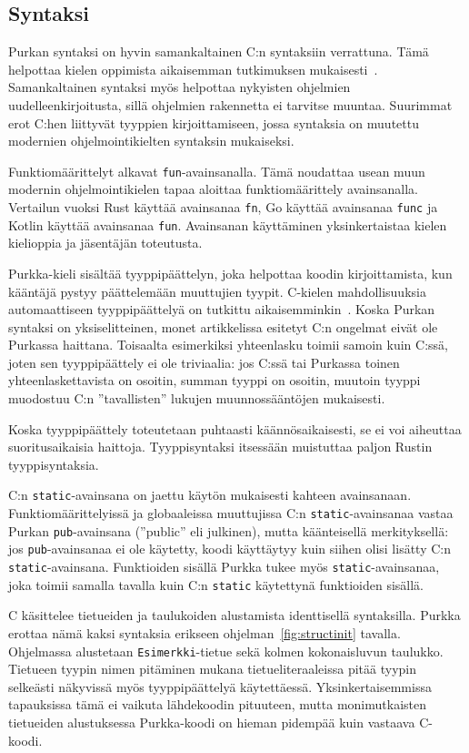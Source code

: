 \subsection{Syntaksi}

Purkan syntaksi on hyvin samankaltainen C:n syntaksiin verrattuna. Tämä
helpottaa kielen oppimista aikaisemman tutkimuksen
mukaisesti~\citep{languagelearning}. Samankaltainen syntaksi myös helpottaa
nykyisten ohjelmien uudelleenkirjoitusta, sillä ohjelmien rakennetta ei
tarvitse muuntaa. Suurimmat erot C:hen liittyvät tyyppien kirjoittamiseen,
jossa syntaksia on muutettu modernien ohjelmointikielten syntaksin mukaiseksi.

Funktiomäärittelyt alkavat \texttt{fun}-avainsanalla. Tämä noudattaa usean muun
modernin ohjelmointikielen tapaa aloittaa funktiomäärittely avainsanalla.
Vertailun vuoksi Rust käyttää avainsanaa \texttt{fn}, Go käyttää avainsanaa
\texttt{func} ja Kotlin käyttää avainsanaa \texttt{fun}. Avainsanan
käyttäminen yksinkertaistaa kielen kielioppia ja jäsentäjän toteutusta.

Purkka-kieli sisältää tyyppipäättelyn, joka helpottaa koodin kirjoittamista,
kun kääntäjä pystyy päättelemään muuttujien tyypit. C-kielen mahdollisuuksia
automaattiseen tyyppipäättelyä on tutkittu
aikaisemminkin~\citep[mm.][]{ctypeinference}. Koska Purkan syntaksi on
yksiselitteinen, monet artikkelissa esitetyt C:n ongelmat eivät ole Purkassa
haittana. Toisaalta esimerkiksi yhteenlasku toimii samoin kuin C:ssä, joten sen
tyyppipäättely ei ole triviaalia: jos C:ssä tai Purkassa toinen
yhteenlaskettavista on osoitin, summan tyyppi on osoitin, muutoin tyyppi
muodostuu C:n ''tavallisten'' lukujen muunnossääntöjen mukaisesti.

Koska tyyppipäättely toteutetaan puhtaasti käännösaikaisesti, se ei voi
aiheuttaa suoritusaikaisia haittoja. Tyyppisyntaksi itsessään muistuttaa paljon
Rustin tyyppisyntaksia.

C:n \texttt{static}-avainsana on jaettu käytön mukaisesti kahteen avainsanaan.
Funktiomäärittelyissä ja globaaleissa muuttujissa C:n
\texttt{static}-avainsanaa vastaa Purkan \texttt{pub}-avainsana (''public'' eli
julkinen), mutta käänteisellä merkityksellä: jos \texttt{pub}-avainsanaa ei ole
käytetty, koodi käyttäytyy kuin siihen olisi lisätty C:n
\texttt{static}-avainsana. Funktioiden sisällä Purkka tukee myös
\texttt{static}-avainsanaa, joka toimii samalla tavalla kuin C:n
\texttt{static} käytettynä funktioiden sisällä.

C käsittelee tietueiden ja taulukoiden alustamista identtisellä syntaksilla.
Purkka erottaa nämä kaksi syntaksia erikseen ohjelman~\ref{fig:structinit}
tavalla. Ohjelmassa alustetaan \texttt{Esimerkki}-tietue sekä kolmen
kokonaisluvun taulukko. Tietueen tyypin nimen pitäminen mukana
tietueliteraaleissa pitää tyypin selkeästi näkyvissä myös tyyppipäättelyä
käytettäessä. Yksinkertaisemmissa tapauksissa tämä ei vaikuta lähdekoodin
pituuteen, mutta monimutkaisten tietueiden alustuksessa Purkka-koodi on hieman
pidempää kuin vastaava C-koodi.

